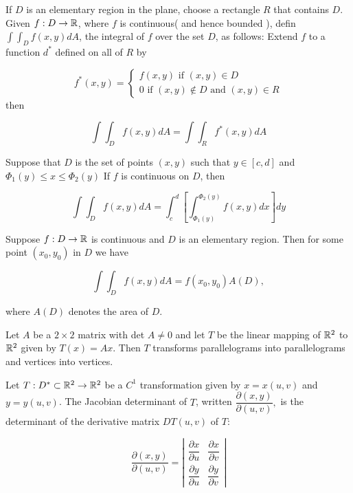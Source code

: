 \begin{defn}
	If $D$ is an elementary region in the plane, choose a rectangle $R$ that contains $D$. Given $f: D \rightarrow \mathbb{R}$, where $f$ is continuous( and hence bounded ), defin $\int\int_{D}f(x,y)dA$, the integral of $f$ over the set $D$, as follows: Extend $f$ to a function $d^*$ defined on all of $R$ by
	
	$$f^*(x,y) = \begin{cases} f(x,y) \text{ if }(x,y) \in D \\ 0 \text{ if } (x,y) \notin D \text{ and }(x,y) \in R\end{cases}$$	
	then
	
	$$\int\int_{D}f(x,y)dA = \int\int_{R}f^* (x,y)dA$$
\end{defn}

\begin{thm*}
	Suppose that $D$ is the set of points $(x,y)$ such that $y \in [c,d]$ and $\Phi_1(y) \leq x \leq \Phi_2(y)$	If $f$ is continuous on $D$, then
	
	$$\int\int_{D}f(x,y)dA = \int^{d}_{c}\left[ \int^{\Phi_2(y)}_{\Phi_1(y)}f(x,y)dx \right]dy$$
\end{thm*}


\begin{thm*}
	Suppose $f: D \rightarrow \mathbb{R}$ is continuous and $D$ is an elementary region. Then for some point $(x_0,y_0)$ in $D$ we have
	
	$$\int\int_{D}f(x,y)dA = f(x_0,y_0)A(D),$$
	
	where $A(D)$ denotes the area of $D$.
\end{thm*}


\begin{thm*}
	Let $A$ be a $2 \times 2$ matrix with det $A \neq 0$ and let $T$ be the linear mapping of $\mathbb{R}^2$ to $\mathbb{R}^2$ given by $T(x) = Ax$. Then $T$	transforms parallelograms into parallelograms and vertices into vertices.
\end{thm*}


\begin{defn}
	Let $T: D^* \subset \mathbb{R}^2 \rightarrow \mathbb{R}^2$ be a $C^1$ transformation given by $x = x(u,v)$ and $y = y(u,v)$. The Jacobian determinant of $T$, written $\dfrac{\partial (x,y)}{\partial (u,v)},$ is the determinant of the derivative matrix $DT(u,v)$ of $T:$
	
	$$\dfrac{\partial (x,y)}{\partial (u,v)} = \left| \begin{matrix} \dfrac{\partial x}{\partial u} & \dfrac{\partial x}{\partial v}\\ \dfrac{\partial y}{\partial u} & \dfrac{\partial y}{\partial v}\end{matrix}\right|$$	
\end{defn}

